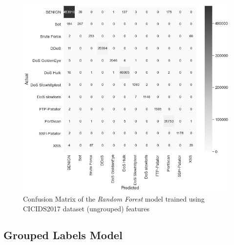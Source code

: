 \begin{figure}[h!]
   \centering
   \includegraphics[scale=0.62]{assets/figures/chapter3/ungrouped_confusion_matrix.png}
   \caption{Confusion Matrix of the \textit{Random Forest} model trained using CICIDS2017 dataset (ungrouped) features}
   \label{fig:ungrouped-confusion-matrix}
\end{figure}

\subsection{Grouped Labels Model}
\label{subsec:grouped-training}

